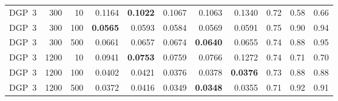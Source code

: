 \begin{table}[htbp]
{\begin{tabular}{lrrrrrrrrrr}
\addlinespace
DGP~3 & 300 & 10 & 0.1164 & \textbf{0.1022} & 0.1067 & 0.1063 & 0.1340 & 0.72 & 0.58 & 0.66 \\
DGP~3 & 300 & 100 & \textbf{0.0565} & 0.0593 & 0.0584 & 0.0569 & 0.0591 & 0.75 & 0.90 & 0.94 \\
DGP~3 & 300 & 500 & 0.0661 & 0.0657 & 0.0674 & \textbf{0.0640} & 0.0655 & 0.74 & 0.88 & 0.95 \\
DGP~3 & 1200 & 10 & 0.0941 & \textbf{0.0753} & 0.0759 & 0.0766 & 0.1272 & 0.74 & 0.71 & 0.70 \\
DGP~3 & 1200 & 100 & 0.0402 & 0.0421 & 0.0376 & 0.0378 & \textbf{0.0376} & 0.73 & 0.88 & 0.88 \\
DGP~3 & 1200 & 500 & 0.0372 & 0.0416 & 0.0349 & \textbf{0.0348} & 0.0355 & 0.71 & 0.92 & 0.91 \\
\bottomrule
\end{tabular}}
\end{table}
